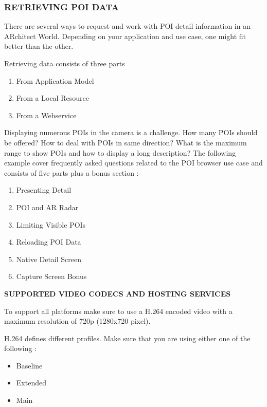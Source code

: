 \documentclass{article}
\begin{document}
\subsubsection{RETRIEVING POI DATA }
\par There are several ways to request and work with POI detail information in an ARchitect World. Depending on your application and use case, one might fit better than the other. 
\par Retrieving data consists of three parts 
\begin{enumerate}
\item From Application Model
\item From a Local Resource 
\item From a Webservice
\end{enumerate}
\par Displaying numerous POIs in the camera is a challenge. How many POIs should be offered? How to deal with POIs in same direction? What is the maximum range to show POIs and how to display a long description? The following example cover frequently asked questions related to the POI browser use case and consists of five parts plus a bonus section :
\begin{enumerate}
\item  Presenting Detail
\item POI and AR Radar 
\item  Limiting Visible POIs 
\item Reloading POI Data
\item  Native Detail Screen 
\item Capture Screen Bonus 
\end{enumerate}

\iffalse
\textbf{SUPPORTED VIDEO CODECS AND HOSTING SERVICES }
\par To support all platforms make sure to use a H.264 encoded video with a maximum resolution of 720p (1280x720 pixel). 
\par H.264 defines different profiles. Make sure that you are using either one of the following :
\begin{itemize}
\item Baseline 
\item Extended 
\item Main 
\end{itemize}
\end{document}
